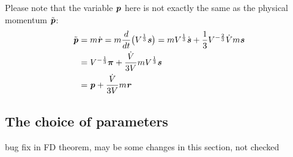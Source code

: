 \documentclass[aps, pre, preprint,unsortedaddress,a4paper,onecolumn]{revtex4}
\newcommand{\recheck}[1]{{\color{red} #1}}
\newcommand{\vect}[1]{\textbf{\textit{#1}}}
\newcommand{\mypi}{\boldsymbol\pi}
\begin{document}
Please note that the variable $\vect p$ here is not exactly the same as the physical momentum $\tilde {\vect p}$:
\begin{align}\nonumber
  \tilde {\vect p}
  &= m \dot{\vect r}
  = m \frac{d}{dt}\big(V^{\frac13}\vect s\big)
  = m V^{\frac13}\dot{\vect s} + \frac13 V^{-\frac23}\dot Vm\vect s \\\nonumber
  & =
  V^{-\frac13}\mypi + \frac{\dot V}{3V}m V^{\frac13}\vect s \\
  &=
  \vect p + \frac{\dot V}{3V}m\vect r
\end{align}

\subsection{The choice of parameters}
\recheck{bug fix in FD theorem, may be some changes in this section, not checked}
\end{document}
